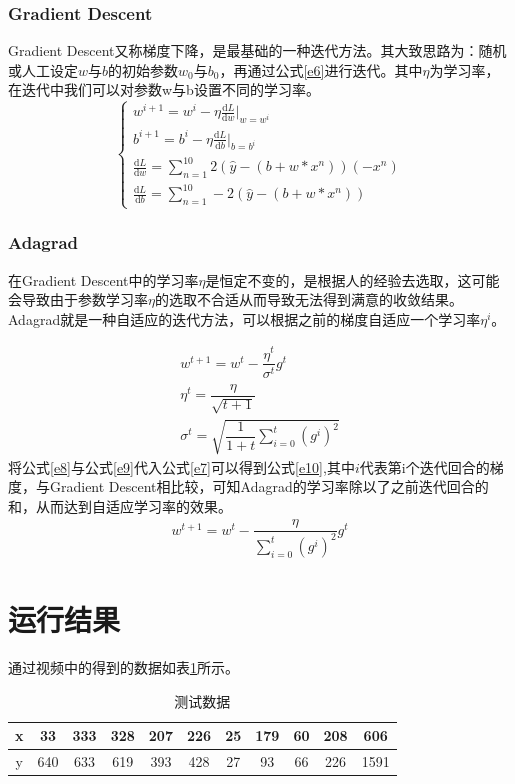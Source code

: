 \documentclass[10]{article}
\begin{document}
			\subsubsection{Gradient Descent}
			Gradient Descent又称梯度下降，是最基础的一种迭代方法。其大致思路为：随机或人工设定$ w $与$ b $的初始参数$ w_{0} $与$ b_{0} $，再通过公式\ref{e6}进行迭代。其中$\eta$为学习率，在迭代中我们可以对参数w与b设置不同的学习率。
			\begin{equation}
				\begin{cases}
					w^{i+1}=w^{i}-\eta \frac{\mathrm{d} L}{\mathrm{d} w}|_{w=w^{i}}\\
					b^{i+1}=b^{i}-\eta \frac{\mathrm{d} L}{\mathrm{d} b}|_{b=b^{i}}\label{e6}	\\
					\frac{\mathrm{d} L}{\mathrm{d} w}=\sum_{n=1}^{10}2(\hat{y}-(b+w*x^{n}))(-x^{n})\\
					\frac{\mathrm{d} L}{\mathrm{d} b}=\sum_{n=1}^{10}-2(\hat{y}-(b+w*x^{n}))
				\end{cases}
			\end{equation} 
			\subsubsection{Adagrad}
			在Gradient Descent中的学习率$\eta$是恒定不变的，是根据人的经验去选取，这可能会导致由于参数学习率$\eta$的选取不合适从而导致无法得到满意的收敛结果。Adagrad就是一种自适应的迭代方法，可以根据之前的梯度自适应一个学习率$\eta^{i}$。
			
			\begin{gather}
				\label{e7}
					w^{t+1}=w^{t}- \dfrac{\eta^{t}}{\sigma^{t}}g^{t}\\
					\label{e8}
					\eta^{t}=\dfrac{\eta}{\sqrt{t+1}}\\
					\label{e9}
					\sigma^{t}=\sqrt{\dfrac{1}{1+t}\sum_{i=0}^{t}(g^{i})^2}
			\end{gather}
			将公式\ref{e8}与公式\ref{e9}代入公式\ref{e7}可以得到公式\ref{e10},其中$i$代表第i个迭代回合的梯度，与Gradient Descent相比较，可知Adagrad的学习率除以了之前迭代回合的和，从而达到自适应学习率的效果。
				\begin{gather}
					w^{t+1}=w^{t}- \dfrac{\eta}{\sum_{i=0}^{t}(g^{i})^2}g^{t}\label{e10}
				\end{gather}	
	\section{运行结果}
		通过视频中的得到的数据如表\ref{table-data}所示。
			\begin{table}[h]
			\centering
			\caption{测试数据}\label{table-data}
				\begin{tabular}{|c| c| c| c| c|c |c| c| c| c|c |}
					\hline
					x&33&333&328&207&226&25&179&60&208&606 \\
					\hline
					y&640&633&619&393&428&27&93&66&226&1591 \\
					\hline
				\end{tabular}
			\end{table}
		
\end{document}

